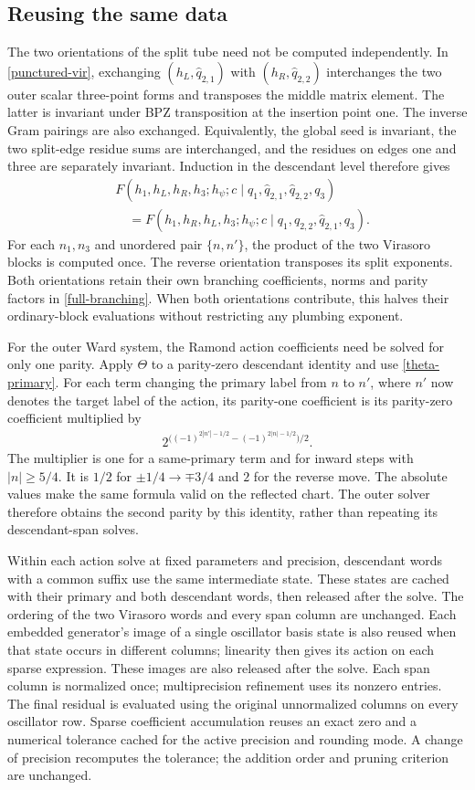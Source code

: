 \documentclass[12pt]{article}
\newcommand{\ie}{\begin{equation}\begin{aligned}}
\newcommand{\fe}{\end{aligned}\end{equation}}
\numberwithin{equation}{section}
\begin{document}
\subsection{Reusing the same data}

The two orientations of the split tube need not be computed independently.
In \eqref{punctured-vir}, exchanging $(h_L,\hat q_{2,1})$ with
$(h_R,\hat q_{2,2})$ interchanges the two outer scalar three-point forms
and transposes the middle matrix element.  The latter is invariant under
BPZ transposition at the insertion point one.  The inverse Gram pairings
are also exchanged.  Equivalently, the global seed is invariant, the two
split-edge residue sums are interchanged, and the residues on edges one
and three are separately invariant.  Induction in the descendant level
therefore gives
\ie
 &F(h_1,h_L,h_R,h_3;h_\psi;c\mid
 q_1,\hat q_{2,1},\hat q_{2,2},q_3)\\
 &\quad=F(h_1,h_R,h_L,h_3;h_\psi;c\mid
 q_1,\hat q_{2,2},\hat q_{2,1},q_3).
\fe
For each $n_1,n_3$ and unordered pair $\{n,n'\}$, the product of the two
Virasoro blocks is computed once.  The reverse orientation transposes
its split exponents.  Both orientations retain their own branching
coefficients, norms and parity factors in \eqref{full-branching}.
When both orientations contribute, this halves their ordinary-block
evaluations without restricting any plumbing exponent.

For the outer Ward system, the Ramond action coefficients need be solved
for only one parity.  Apply $\Theta$ to a parity-zero descendant identity
and use
\eqref{theta-primary}.  For each term changing the primary label from
$n$ to $n'$, where $n'$ now denotes the target label of the action,
its parity-one coefficient is its parity-zero coefficient multiplied by
\ie
 2^{\bigl((-1)^{2|n'|-1/2}-(-1)^{2|n|-1/2}\bigr)/2}.
\fe
The multiplier is one for a same-primary term and for inward steps with
$|n|\geq5/4$.  It is $1/2$ for $\pm1/4\to\mp3/4$ and $2$ for the
reverse move.  The absolute values make the same formula valid on the
reflected chart.  The outer solver therefore obtains the second parity
by this identity, rather than repeating its descendant-span solves.

Within each action solve at fixed parameters and precision, descendant
words with a common suffix use the same intermediate state.  These states
are cached with their primary
and both descendant words, then released after the solve.  The ordering
of the two Virasoro words and every span column are unchanged.  Each
embedded generator's image of a single oscillator basis state is also
reused when that state occurs in different columns; linearity then gives
its action on each sparse expression.  These images are also released
after the solve.  Each span column is normalized once; multiprecision
refinement uses its nonzero entries.  The final residual is evaluated
using the original unnormalized columns on every oscillator row.
Sparse coefficient accumulation reuses an exact zero and a numerical
tolerance cached for the active precision and rounding mode.  A change
of precision recomputes the tolerance; the addition order and pruning
criterion are unchanged.
\end{document}
